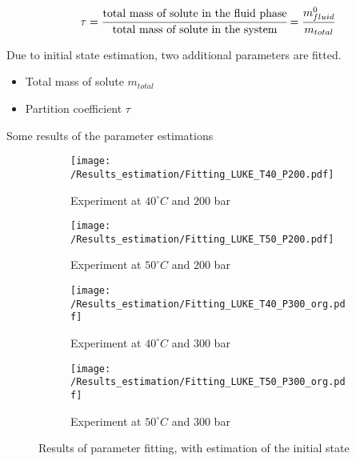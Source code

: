 \documentclass[../Article_Model_Parameters.tex]{subfiles}
\begin{document}
    {\footnotesize
    \begin{equation*}
        \tau = \cfrac{\text{total mass of solute in the fluid phase}}{\text{total mass of solute in the system}} = \cfrac{m^0_{fluid}}{m_{total}}
    \end{equation*}
    }

    Due to initial state estimation, two additional parameters are fitted.

    \begin{itemize}
        \item Total mass of solute $m_{total}$
        \item Partition coefficient $\tau$
    \end{itemize}
	
	Some results of the parameter estimations

	\begin{figure*}
		\centering
		\begin{subfigure}[b]{0.7\textwidth}
			\centering
			\texttt{[image: /Results\_estimation/Fitting\_LUKE\_T40\_P200.pdf]}
			\caption{Experiment at $40^\circ C$ and $200$ bar}
		\end{subfigure}
		\hfill
		\begin{subfigure}[b]{0.7\textwidth}
			\centering
			\texttt{[image: /Results\_estimation/Fitting\_LUKE\_T50\_P200.pdf]}
			\caption{Experiment at $50^\circ C$ and $200$ bar}
		\end{subfigure}
		\hfill
		\begin{subfigure}[b]{0.7\textwidth}
			\centering
			\texttt{[image: /Results\_estimation/Fitting\_LUKE\_T40\_P300\_org.pdf]}
			\caption{Experiment at $40^\circ C$ and $300$ bar}
		\end{subfigure}
		\hfill
		\begin{subfigure}[b]{0.7\textwidth}
			\centering
			\texttt{[image: /Results\_estimation/Fitting\_LUKE\_T50\_P300\_org.pdf]}
			\caption{Experiment at $50^\circ C$ and $300$ bar}
		\end{subfigure}
		\caption{Results of parameter fitting, with estimation of the initial state}
	\end{figure*}
\end{document}
